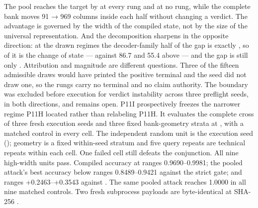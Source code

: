 {}\markdownRendererInterblockSeparator
{}The pool reaches the target by  at every  rung and at no  rung, while the complete bank moves 91 → 969 columns inside each half without changing a verdict. The advantage is governed by the width of the compiled state, not by the size of the universal representation.\markdownRendererInterblockSeparator
{}And the decomposition sharpens in the opposite direction: at the drawn regimes the decoder-family half of the  gap is exactly , so \markdownRendererStrongEmphasis{100\markdownRendererPercentSign{}} of it is the change of state — against 86.7\markdownRendererPercentSign{} and 55.4\markdownRendererPercentSign{} above — and the gap is still only . Attribution and magnitude are different questions.\markdownRendererInterblockSeparator
{}Three of the fifteen admissible draws would have printed the positive terminal and the seed did not draw one, so the  rungs carry no terminal and no claim authority. The  boundary was excluded before execution for verdict instability across three preflight seeds, in both directions, and remains open.\markdownRendererInterblockSeparator
{}
\markdownRendererSectionEnd \markdownRendererSectionBegin
{}\markdownRendererInterblockSeparator
{}P11I prospectively freezes the narrower regime P11H located rather than relabeling P11H. It evaluates the complete cross of three fresh execution seeds and three fixed bank-geometry strata at , with a matched  control in every cell. The independent random unit is the execution seed (); geometry is a fixed within-seed stratum and five query repeats are technical repeats within each cell. One failed cell still defeats the conjunction.\markdownRendererInterblockSeparator
{}All nine high-width units pass. Compiled accuracy at  ranges 0.9690–0.9981; the pooled attack's best accuracy below  ranges 0.8489–0.9421 against the strict  gate; and  ranges +0.2463–+0.3543 against . The same pooled attack reaches 1.0000 in all nine matched  controls. Two fresh subprocess payloads are byte-identical at SHA-256 .\markdownRendererInterblockSeparator

